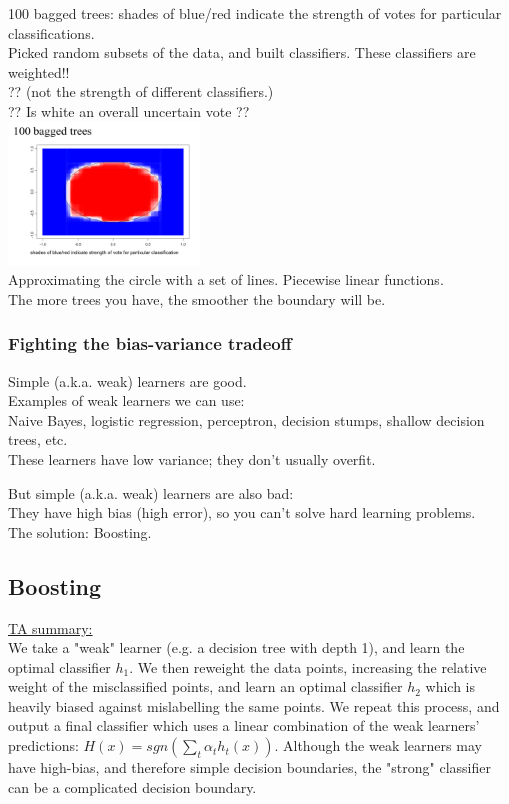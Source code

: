 100 bagged trees:  shades of blue/red indicate the strength of votes for particular classifications. \hfill \\
Picked random subsets of the data, and built classifiers.  These classifiers are weighted!! \hfill \\  %
?? (not the strength of different classifiers.)   \hfill \\ 
?? Is white an overall uncertain vote ??   \hfill \\ 
\includegraphics[width=2in]{figures/100_bagged_trees.pdf} \hfill \\
Approximating the circle with a set of lines.  Piecewise linear functions. \hfill \\ %
The more trees you have, the smoother the boundary will be. 

\subsubsection{Fighting the bias-variance tradeoff}
Simple (a.k.a. weak) learners are good. \hfill \\ 
Examples of weak learners we can use: \hfill \\ 
Naive Bayes, logistic regression, perceptron, decision stumps, shallow decision trees, etc. \hfill \\ 
These learners have low variance; they don't usually overfit. 

But simple (a.k.a. weak) learners are also bad: \hfill \\ 
They have high bias (high error), so you can't solve hard learning problems. \hfill \\ 

The solution: Boosting. 

\subsection{Boosting}

\underline{TA summary:} \hfill \\
We take a "weak" learner (e.g. a decision tree with depth 1), and learn the optimal classifier $h_1$. 
We then reweight the data points, increasing the relative weight of the misclassified points, and learn an optimal classifier $h_2$ which is heavily biased against mislabelling the same points. 
We repeat this process, and output a final classifier which uses a linear combination of the weak learners' predictions: $H(x) = sgn(\sum_t \alpha_t h_t(x))$. 
Although the weak learners may have high-bias, and therefore simple decision boundaries, the "strong" classifier can be a complicated decision boundary.

